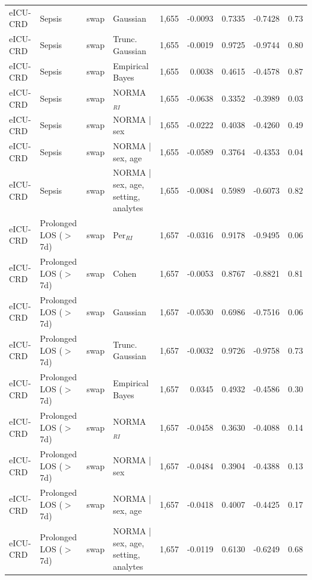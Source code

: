 \begin{table}[ht]
\begin{tabular}{ll l l r r r r r}
eICU-CRD & Sepsis & swap & Gaussian & 1,655 & -0.0093 & 0.7335 & -0.7428 & 0.73 \\
eICU-CRD & Sepsis & swap & Trunc. Gaussian & 1,655 & -0.0019 & 0.9725 & -0.9744 & 0.80 \\
eICU-CRD & Sepsis & swap & Empirical Bayes & 1,655 & 0.0038 & 0.4615 & -0.4578 & 0.87 \\
eICU-CRD & Sepsis & swap & NORMA$_{RI}$ & 1,655 & -0.0638 & 0.3352 & -0.3989 & 0.03 \\
eICU-CRD & Sepsis & swap & NORMA | sex & 1,655 & -0.0222 & 0.4038 & -0.4260 & 0.49 \\
eICU-CRD & Sepsis & swap & NORMA | sex, age & 1,655 & -0.0589 & 0.3764 & -0.4353 & 0.04 \\
eICU-CRD & Sepsis & swap & NORMA | sex, age, setting, analytes & 1,655 & -0.0084 & 0.5989 & -0.6073 & 0.82 \\
eICU-CRD & Prolonged LOS ($>$7d) & swap & Per$_{RI}$ & 1,657 & -0.0316 & 0.9178 & -0.9495 & 0.06 \\
eICU-CRD & Prolonged LOS ($>$7d) & swap & Cohen & 1,657 & -0.0053 & 0.8767 & -0.8821 & 0.81 \\
eICU-CRD & Prolonged LOS ($>$7d) & swap & Gaussian & 1,657 & -0.0530 & 0.6986 & -0.7516 & 0.06 \\
eICU-CRD & Prolonged LOS ($>$7d) & swap & Trunc. Gaussian & 1,657 & -0.0032 & 0.9726 & -0.9758 & 0.73 \\
eICU-CRD & Prolonged LOS ($>$7d) & swap & Empirical Bayes & 1,657 & 0.0345 & 0.4932 & -0.4586 & 0.30 \\
eICU-CRD & Prolonged LOS ($>$7d) & swap & NORMA$_{RI}$ & 1,657 & -0.0458 & 0.3630 & -0.4088 & 0.14 \\
eICU-CRD & Prolonged LOS ($>$7d) & swap & NORMA | sex & 1,657 & -0.0484 & 0.3904 & -0.4388 & 0.13 \\
eICU-CRD & Prolonged LOS ($>$7d) & swap & NORMA | sex, age & 1,657 & -0.0418 & 0.4007 & -0.4425 & 0.17 \\
eICU-CRD & Prolonged LOS ($>$7d) & swap & NORMA | sex, age, setting, analytes & 1,657 & -0.0119 & 0.6130 & -0.6249 & 0.68 \\
\bottomrule
\end{tabular}
\label{tab:14_nri}
\end{table}